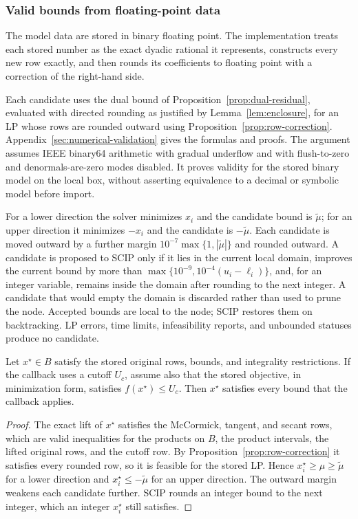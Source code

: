 \subsubsection{Valid bounds from floating-point data}

The model data are stored in binary floating point. The implementation treats
each stored number as the exact dyadic rational it represents, constructs every
new row exactly, and then rounds its coefficients to floating point with a
correction of the right-hand side.

Each candidate uses the dual bound of Proposition~\ref{prop:dual-residual},
evaluated with directed rounding as justified by Lemma~\ref{lem:enclosure},
for an LP whose rows are rounded outward using
Proposition~\ref{prop:row-correction}. Appendix~\ref{sec:numerical-validation}
gives the formulas and proofs. The argument assumes IEEE binary64 arithmetic
with gradual underflow and with flush-to-zero and denormals-are-zero modes
disabled. It proves validity for the stored binary model on the local box,
without asserting equivalence to a decimal or symbolic model before import.

For a lower direction the solver minimizes $x_i$ and the candidate bound is
$\tilde\mu$; for an upper direction it minimizes $-x_i$ and the candidate is
$-\tilde\mu$. Each candidate is moved outward by a further margin
$10^{-7}\max\{1,|\tilde\mu|\}$ and rounded outward. A candidate is proposed to
SCIP only if it lies in the current local domain, improves the current bound by
more than $\max\{10^{-9},10^{-4}(u_i-\ell_i)\}$, and, for an integer variable,
remains inside the domain after rounding to the next integer. A candidate that
would empty the domain is discarded rather than used to prune the node.
Accepted bounds are local to the node; SCIP restores them on backtracking.
LP errors, time limits, infeasibility reports, and unbounded statuses produce
no candidate.

\begin{proposition}\label{prop:sidecar-validity}
Let $x^\star\in B$ satisfy the stored original rows, bounds, and integrality
restrictions. If the callback uses a cutoff $U_c$, assume also that the stored
objective, in minimization form, satisfies $f(x^\star)\le U_c$. Then $x^\star$
satisfies every bound that the callback applies.
\end{proposition}

\begin{proof}
The exact lift of $x^\star$ satisfies the McCormick, tangent, and secant rows,
which are valid inequalities for the products on $B$, the product intervals,
the lifted original rows, and the cutoff row. By
Proposition~\ref{prop:row-correction} it satisfies every rounded row, so it is
feasible for the stored LP. Hence $x^\star_i\ge\mu\ge\tilde\mu$ for a lower
direction and $x^\star_i\le-\tilde\mu$ for an upper direction. The outward
margin weakens each candidate further. SCIP rounds an integer bound to the
next integer, which an integer $x^\star_i$ still satisfies.
\end{proof}

